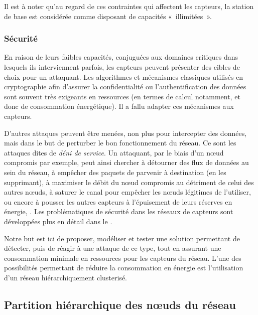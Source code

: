 Il est à noter qu'au regard de ces contraintes qui affectent les capteurs, la station de base est considérée comme disposant de capacités « illimitées ».

        \subsubsection{Sécurité}
En raison de leurs faibles capacités, conjuguées aux domaines critiques dans lesquels ils interviennent parfois, les capteurs peuvent présenter des cibles de choix pour un attaquant.
Les algorithmes et mécanismes classiques utilisés en cryptographie afin d'assurer la confidentialité ou l'authentification des données sont souvent très exigeants en ressources (en termes de calcul notamment, et donc de consommation énergétique).
Il a fallu adapter ces mécanismes aux capteurs.

D'autres attaques peuvent être menées, non plus pour intercepter des données, mais dans le but de perturber le bon fonctionnement du réseau.
Ce sont les attaques dites de \textit{déni de service}.
Un attaquant, par le biais d'un nœud compromis par exemple, peut ainsi chercher à détourner des flux de données au sein du réseau, à empêcher des paquets de parvenir à destination (en les supprimant), à maximiser le débit du nœud compromis au détriment de celui des autres nœuds, à saturer le canal pour empêcher les nœuds légitimes de l'utiliser, ou encore à pousser les autres capteurs à l'épuisement de leurs réserves en énergie, \etc.
Les problématiques de sécurité dans les réseaux de capteurs sont développées plus en détail dans le .

Notre but est ici de proposer, modéliser et tester une solution permettant de détecter, puis de réagir à une attaque de ce type, tout en assurant une consommation minimale en ressources pour les capteurs du réseau.
L'une des possibilités permettant de réduire la consommation en énergie est l'utilisation d'un réseau hiérarchiquement clusterisé.

    \subsection{Partition hiérarchique des nœuds du réseau}
    \label{st:subsec:partition}

